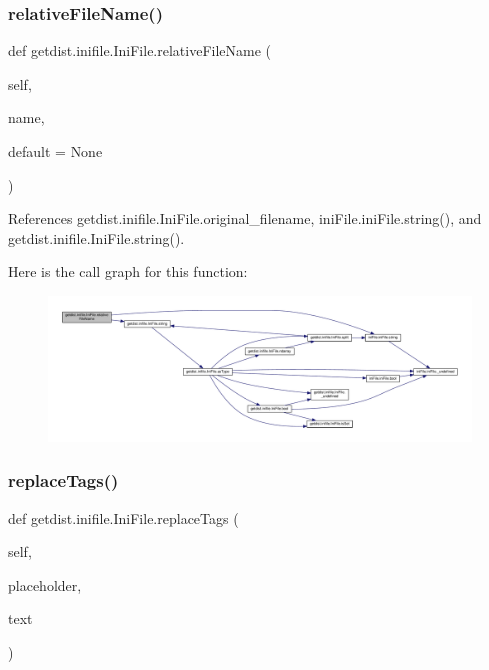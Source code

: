 \subsubsection{\texorpdfstring{relative\+File\+Name()}{relativeFileName()}}
{\footnotesize\ttfamily def getdist.\+inifile.\+Ini\+File.\+relative\+File\+Name (\begin{DoxyParamCaption}\item[{}]{self,  }\item[{}]{name,  }\item[{}]{default = {\ttfamily None} }\end{DoxyParamCaption})}



References getdist.\+inifile.\+Ini\+File.\+original\+\_\+filename, ini\+File.\+ini\+File.\+string(), and getdist.\+inifile.\+Ini\+File.\+string().

Here is the call graph for this function\+:
\nopagebreak
\begin{figure}[H]
\begin{center}
\leavevmode
\includegraphics[width=350pt]{classgetdist_1_1inifile_1_1IniFile_aa45dd09190b83f711db6d9ab55605f50_cgraph}
\end{center}
\end{figure}
\mbox{\label{classgetdist_1_1inifile_1_1IniFile_a1517e8a2b5f681bd333fc9e3d2b5294e}} 
\subsubsection{\texorpdfstring{replace\+Tags()}{replaceTags()}}
{\footnotesize\ttfamily def getdist.\+inifile.\+Ini\+File.\+replace\+Tags (\begin{DoxyParamCaption}\item[{}]{self,  }\item[{}]{placeholder,  }\item[{}]{text }\end{DoxyParamCaption})}



